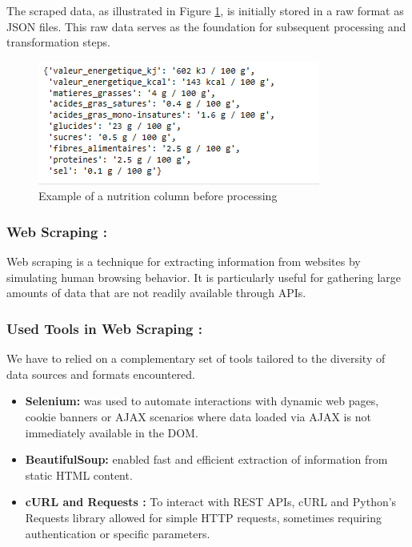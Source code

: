 \par The scraped data, as illustrated in Figure \ref{fig:Nutrition_column}, is initially stored in a raw format as JSON files. This raw data serves as the foundation for subsequent processing and transformation steps.
\begin{center}
\begin{figure}[H]
\centering
\includegraphics[scale=0.66]{images/nutrition.png}
\caption{Example of a nutrition column before processing} 
\label{fig:Nutrition_column}
\end{figure}
\end{center}

\subsubsection{Web Scraping :}
\par Web scraping is a technique for extracting information from websites by simulating human
browsing behavior. It is particularly useful for gathering large amounts
of data that are not readily available through APIs\cite{2025webscraping}.

\subsubsection{Used Tools in Web Scraping :}
\par We have to relied on a complementary set of tools tailored to the diversity
of data sources and formats encountered.

\begin{itemize}[label=\textbf{-}]
    \item \textbf{Selenium:} was used to automate interactions with dynamic web pages, cookie banners or  AJAX scenarios where data loaded via AJAX is not immediately available in the DOM.
    \item \textbf{BeautifulSoup:}  enabled fast and efficient extraction of information from static HTML content.
    \item \textbf{cURL and Requests :} To interact with REST APIs, cURL and Python’s Requests library allowed for simple HTTP requests, sometimes requiring authentication or specific parameters. 
\end{itemize}

